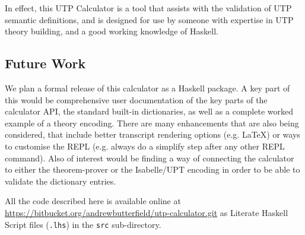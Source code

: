 In effect, this UTP Calculator is a tool that assists
with the validation of UTP semantic definitions,
and is designed for use by someone with expertise
in UTP theory building,
and a good working knowledge of Haskell.


\subsection{Future Work}

We plan a formal release of this calculator as a Haskell package.
A key part of this would be comprehensive
user documentation of the key parts of the calculator API,
the standard built-in dictionaries,
as well as a complete worked example of a theory encoding.
There are many enhancements that are also being considered,
that include better transcript rendering options
(e.g. \LaTeX) or ways to customise the REPL
(e.g. always do a simplify step after any other REPL command).
Also of interest would be finding
a way of connecting the calculator
to either the  theorem-prover\cite{DBLP:conf/utp/Butterfield10}
or the Isabelle/UPT encoding\cite{DBLP:conf/utp/FosterZW14}
in order to be able to validate the dictionary entries.

All the code described here is available online
at
\\\url{https://bitbucket.org/andrewbutterfield/utp-calculator.git}
as Literate Haskell Script files (\texttt{.lhs})
in the \texttt{src} sub-directory.
